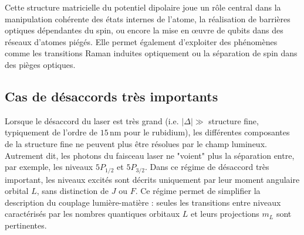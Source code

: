 Cette structure matricielle du potentiel dipolaire joue un rôle central dans la manipulation cohérente des états internes de l’atome, la réalisation de barrières optiques dépendantes du spin, ou encore la mise en œuvre de qubits dans des réseaux d’atomes piégés. Elle permet également d’exploiter des phénomènes comme les transitions Raman induites optiquement ou la séparation de spin dans des pièges optiques.



 
 \subsection{Cas de désaccords très importants}

Lorsque le désaccord du laser est très grand (i.e. $|\Delta| \gg$ structure fine, typiquement de l’ordre de $15\,\mathrm{nm}$ pour le rubidium), les différentes composantes de la structure fine ne peuvent plus être résolues par le champ lumineux. Autrement dit, les photons du faisceau laser ne "voient" plus la séparation entre, par exemple, les niveaux $5P_{1/2}$ et $5P_{3/2}$. Dans ce régime de désaccord très important, les niveaux excités sont décrits uniquement par leur moment angulaire orbital $L$, sans distinction de $J$ ou $F$. Ce régime permet de simplifier la description du couplage lumière-matière : seules les transitions entre niveaux caractérisés par les nombres quantiques orbitaux $L$ et leurs projections $m_L$ sont pertinentes.

